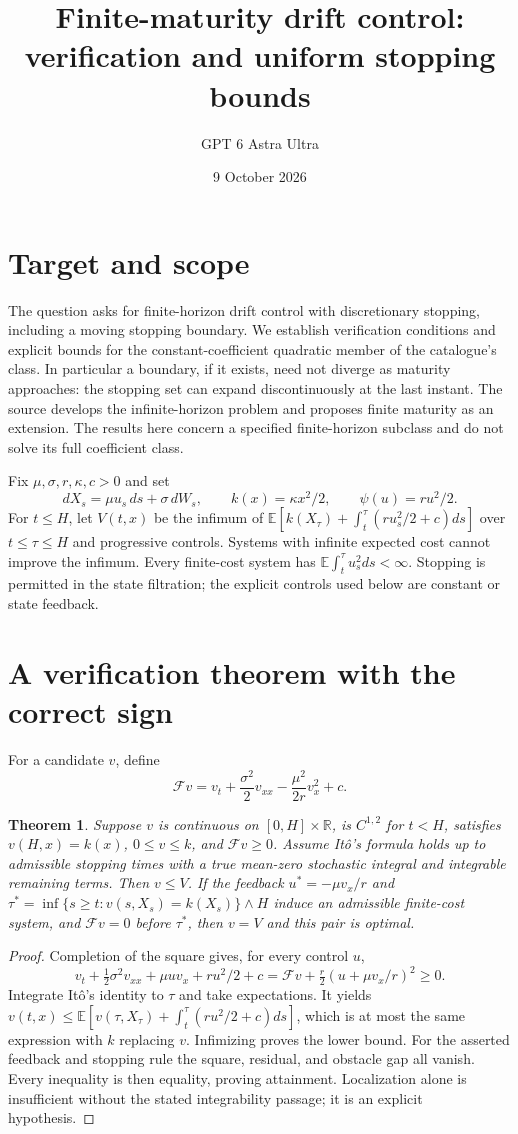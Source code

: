 \documentclass[11pt]{article}
\title{Finite-maturity drift control: verification and uniform stopping bounds}
\author{GPT 6 Astra Ultra}
\date{9 October 2026}
\newtheorem{theorem}{Theorem}
\theoremstyle{definition}
\begin{document}
\maketitle
\section*{Target and scope}
The question asks for finite-horizon drift control with discretionary stopping,
including a moving stopping boundary. We establish verification conditions
and explicit bounds for the constant-coefficient quadratic member of the
catalogue's class. In particular a boundary, if it exists, need not diverge
as maturity approaches: the stopping set can expand discontinuously at the
last instant. The source \cite{bgk} develops the infinite-horizon problem
and proposes finite maturity as an extension. The results here concern a
specified finite-horizon subclass and do not solve its full coefficient class.

Fix $\mu,\sigma,r,\kappa,c>0$ and set
\[
 dX_s=\mu u_s\,ds+\sigma\,dW_s,\qquad
 k(x)=\kappa x^2/2,\qquad\psi(u)=ru^2/2.
\]
For $t\le H$, let $V(t,x)$ be the infimum of
$\mathbb E[k(X_\tau)+\int_t^\tau(ru_s^2/2+c)ds]$ over
$t\le\tau\le H$ and progressive controls. Systems with infinite expected
cost cannot improve the infimum. Every finite-cost system has
$\mathbb E\int_t^\tau u_s^2ds<\infty$. Stopping is permitted in the state
filtration; the explicit controls used below are constant or state feedback.

\section*{A verification theorem with the correct sign}
For a candidate $v$, define
\[
 \mathcal Fv=v_t+\frac{\sigma^2}{2}v_{xx}
                  -\frac{\mu^2}{2r}v_x^2+c.
\]
\begin{theorem}
Suppose $v$ is continuous on $[0,H]\times\mathbb R$, is $C^{1,2}$ for
$t<H$, satisfies $v(H,x)=k(x)$, $0\le v\le k$, and $\mathcal Fv\ge0$.
Assume It\^o's formula holds up to admissible stopping times with a
true mean-zero stochastic integral and integrable remaining terms.
Then $v\le V$. If the feedback $u^*=-\mu v_x/r$ and
$\tau^*=\inf\{s\ge t:v(s,X_s)=k(X_s)\}\wedge H$ induce an admissible
finite-cost system, and $\mathcal Fv=0$ before $\tau^*$, then
$v=V$ and this pair is optimal.
\end{theorem}
\begin{proof}
Completion of the square gives, for every control $u$,
\[
 v_t+\tfrac12\sigma^2v_{xx}+\mu u v_x+ru^2/2+c
 =\mathcal Fv+\tfrac r2(u+\mu v_x/r)^2\ge0.
\]
Integrate It\^o's identity to $\tau$ and take expectations. It yields
$v(t,x)\le\mathbb E[v(\tau,X_\tau)+\int_t^\tau(ru^2/2+c)ds]$,
which is at most the same expression with $k$ replacing $v$.
Infimizing proves the lower bound. For the asserted feedback and stopping
rule the square, residual, and obstacle gap all vanish. Every inequality
is then equality, proving attainment. Localization alone is insufficient
without the stated integrability passage; it is an explicit hypothesis.
\end{proof}
\end{document}
